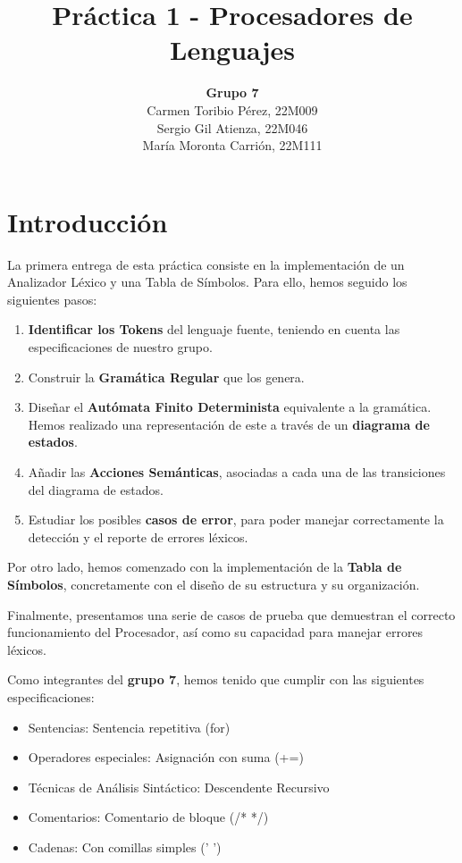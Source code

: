\documentclass{article}
\title{\textbf{Práctica 1 - Procesadores de Lenguajes}}
\author{\textbf{Grupo 7}\\Carmen Toribio Pérez, 22M009\\Sergio Gil Atienza, 22M046\\María Moronta Carrión, 22M111}
\date{}
\begin{document}
\maketitle

\section{Introducción}

La primera entrega de esta práctica consiste en la implementación de un Analizador Léxico y una Tabla de Símbolos. Para ello, hemos seguido los siguientes pasos: 
\begin{enumerate}
    \item \textbf{Identificar los Tokens} del lenguaje fuente, teniendo en cuenta las especificaciones de nuestro grupo.
    \item Construir la \textbf{Gramática Regular} que los genera.
    \item Diseñar el \textbf{Autómata Finito Determinista} equivalente a la gramática. Hemos realizado una representación de este a través de un \textbf{diagrama de estados}.
    \item Añadir las \textbf{Acciones Semánticas}, asociadas a cada una de las transiciones del diagrama de estados.
    \item Estudiar los posibles \textbf{casos de error}, para poder manejar correctamente la detección y el reporte de errores léxicos. 
\end{enumerate}

 \vspace{0.5cm}
 
 Por otro lado, hemos comenzado con la implementación de la \textbf{Tabla de Símbolos}, concretamente con el diseño de su estructura y su organización.

 \vspace{0.5cm}
 
 Finalmente, presentamos una serie de casos de prueba que demuestran el correcto funcionamiento del Procesador, así como su capacidad para manejar errores léxicos.

 \vspace{0.5cm}

Como integrantes del \textbf{grupo 7}, hemos tenido que cumplir con las siguientes especificaciones: 
\begin{itemize}[left=2cm]
    \item Sentencias: Sentencia repetitiva (for)
    \item Operadores especiales: Asignación con suma (+=)
    \item Técnicas de Análisis Sintáctico: Descendente Recursivo
    \item Comentarios: Comentario de bloque (/* */)
    \item Cadenas: Con comillas simples (' ')
\end{itemize}
\end{document}
